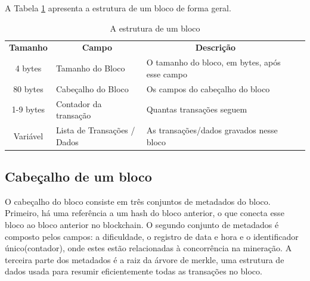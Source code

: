         A Tabela \ref{tabela_estrutura_de_um_bloco} apresenta a estrutura de um bloco de forma geral.
        
  
        \begin{table}[H]
            \caption{A estrutura de um bloco}
            \begin{tabular}{|c|l|l|ll}
            \cline{1-3}
            \cellcolor[HTML]{FFFFFF}\textbf{Tamanho} & \multicolumn{1}{c|}{\cellcolor[HTML]{FFFFFF}\textbf{Campo}} & \multicolumn{1}{c|}{\cellcolor[HTML]{FFFFFF}\textbf{Descrição}} &  &  \\ \cline{1-3}
            4 bytes                                  & Tamanho do Bloco                                            & O tamanho do bloco, em bytes, após esse campo                   &  &  \\ \cline{1-3}
            80 bytes                                 & Cabeçalho do Bloco                                          & Os campos do cabeçalho do bloco                                 &  &  \\ \cline{1-3}
            1-9 bytes                                & Contador da transação                                       & Quantas transações seguem                                       &  &  \\ \cline{1-3}
            Variável                                 & Lista de Transações / Dados                                 & As transações/dados gravados nesse bloco                              &  &  \\ \cline{1-3}
            \end{tabular}
        \label{tabela_estrutura_de_um_bloco}
        \end{table}
            
    \subsection{Cabeçalho de um bloco}

    O cabeçalho do bloco consiste em três conjuntos de metadados do bloco. Primeiro, há uma referência a um hash do bloco anterior, o que conecta esse bloco ao bloco anterior no blockchain. O segundo conjunto de metadados é composto pelos campos: a dificuldade, o registro de data e hora e o identificador único(contador), onde estes estão relacionadas à concorrência na mineração. A terceira parte dos metadados é a raiz da árvore de merkle, uma estrutura de dados usada para resumir eficientemente todas as transações no bloco.\cite{mastering_blockchain_andreas}

